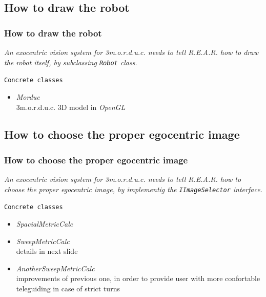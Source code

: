 \subsection{How to draw the robot}
\frame
{
  \frametitle{How to draw the robot}
  
  \emph{An exocentric vision system for \textit{3m.o.r.d.u.c.} 
    needs to tell \textit{R.E.A.R.} how to draw the robot itself,
    by subclassing \texttt{Robot} class.}
  \pause

  \vskip15pt

  \begin{block} {\alert{\texttt{Concrete classes}}}

    \pause
    \begin{itemize}
      
    \item \alert{\textit{Morduc}} \\
      3m.o.r.d.u.c. 3D model in \textit{OpenGL}
    \end{itemize}

  \end{block}
}

\subsection{How to choose the proper egocentric image}
\frame
{
  \frametitle{How to choose the proper egocentric image}
  
  \emph{An exocentric vision system for \textit{3m.o.r.d.u.c.} 
    needs to tell \textit{R.E.A.R.} how to choose the proper egocentric image,
    by implementig the \texttt{IImageSelector} interface.}
  \pause

  \vskip15pt

  \begin{block} {\alert{\texttt{Concrete classes}}}

    \begin{itemize}
      
    \pause
    \item \alert{\textit{SpacialMetricCalc}}
    \pause
    \item \alert{\textit{SweepMetricCalc}} \\
      details in next slide
    \pause
    \item \alert{\textit{AnotherSweepMetricCalc}} \\
      improvements of previous one, in order to
      provide user with more confortable teleguiding
      in case of strict turns

    \end{itemize}

  \end{block}
}


